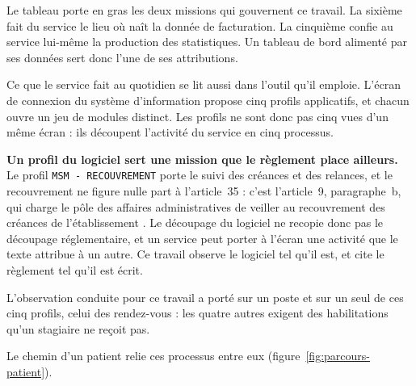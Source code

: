 Le tableau porte en gras les deux missions qui gouvernent ce travail. La sixième fait du service le
lieu où naît la donnée de facturation. La cinquième confie au service lui-même la production des
statistiques. Un tableau de bord alimenté par ses données sert donc l'une de ses attributions.

\medskip

Ce que le service fait au quotidien se lit aussi dans l'outil qu'il emploie. L'écran de connexion
du système d'information propose cinq profils applicatifs, et chacun ouvre un jeu de modules
distinct. Les profils ne sont donc pas cinq vues d'un même écran : ils
découpent l'activité du service en cinq processus.

\textbf{Un profil du logiciel sert une mission que le règlement place ailleurs.} Le profil
\texttt{MSM - RECOUVREMENT} porte le suivi des créances et des relances, et le
recouvrement ne figure nulle part à l'article~35 : c'est l'article~9, paragraphe~b, qui charge le
pôle des affaires administratives de veiller au recouvrement des créances de l'établissement
\cite{s27}. Le découpage du logiciel ne recopie donc pas le découpage réglementaire, et un service
peut porter à l'écran une activité que le texte attribue à un autre. Ce travail observe le
logiciel tel qu'il est, et cite le règlement tel qu'il est écrit.

L'observation conduite pour ce travail a porté sur un poste et sur un seul de ces cinq profils,
celui des rendez-vous : les quatre autres exigent des habilitations qu'un stagiaire ne reçoit
pas.

Le chemin d'un patient relie ces processus entre eux (figure~\ref{fig:parcours-patient}).

